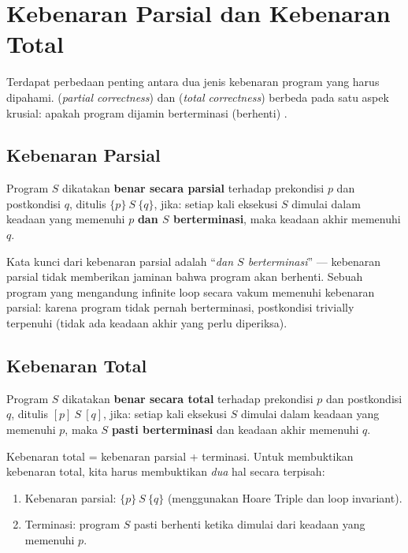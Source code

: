 \section{Kebenaran Parsial dan Kebenaran Total}

Terdapat perbedaan penting antara dua jenis kebenaran program yang harus dipahami.  (\textit{partial correctness}) dan  (\textit{total correctness}) berbeda pada satu aspek krusial: apakah program dijamin berterminasi (berhenti) \cite{rosen2019}.

\subsection{Kebenaran Parsial}

\begin{definisi}
Program $S$ dikatakan \textbf{benar secara parsial} terhadap prekondisi $p$ dan postkondisi $q$, ditulis $\{p\}\ S\ \{q\}$, jika: setiap kali eksekusi $S$ dimulai dalam keadaan yang memenuhi $p$ \textbf{dan $S$ berterminasi}, maka keadaan akhir memenuhi $q$.
\end{definisi}

Kata kunci dari kebenaran parsial adalah ``\textit{dan $S$ berterminasi}'' --- kebenaran parsial tidak memberikan jaminan bahwa program akan berhenti. Sebuah program yang mengandung infinite loop secara vakum memenuhi kebenaran parsial: karena program tidak pernah berterminasi, postkondisi trivially terpenuhi (tidak ada keadaan akhir yang perlu diperiksa).

\subsection{Kebenaran Total}

\begin{definisi}
Program $S$ dikatakan \textbf{benar secara total} terhadap prekondisi $p$ dan postkondisi $q$, ditulis $[p]\ S\ [q]$, jika: setiap kali eksekusi $S$ dimulai dalam keadaan yang memenuhi $p$, maka $S$ \textbf{pasti berterminasi} dan keadaan akhir memenuhi $q$.
\end{definisi}

Kebenaran total = kebenaran parsial + terminasi. Untuk membuktikan kebenaran total, kita harus membuktikan \emph{dua} hal secara terpisah:
\begin{enumerate}
    \item Kebenaran parsial: $\{p\}\ S\ \{q\}$ (menggunakan Hoare Triple dan loop invariant).
    \item Terminasi: program $S$ pasti berhenti ketika dimulai dari keadaan yang memenuhi $p$.
\end{enumerate}

